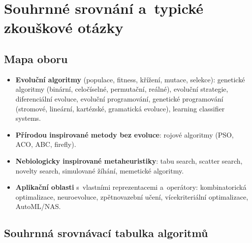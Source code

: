 \documentclass[11pt,a4paper]{article}
\theoremstyle{definition}
\begin{document}
\section*{Souhrnné srovnání a~typické zkouškové otázky}
\label{sec:zaver}
\subsection*{Mapa oboru}

\begin{itemize}
\item \textbf{Evoluční algoritmy} (populace, fitness, křížení, mutace, selekce):
  genetické algoritmy (binární, celočíselné, permutační, reálné), evoluční
  strategie, diferenciální evoluce, evoluční programování, genetické
  programování (stromové, lineární, kartézské, gramatická evoluce),
  learning classifier systems.
\item \textbf{Přírodou inspirované metody bez evoluce}: rojové algoritmy
  (PSO, ACO, ABC, firefly).
\item \textbf{Nebiologicky inspirované metaheuristiky}: tabu search,
  scatter search, novelty search, simulované žíhání, memetické algoritmy.
\item \textbf{Aplikační oblasti} s~vlastními reprezentacemi a~operátory:
  kombinatorická optimalizace, neuroevoluce, zpětnovazební učení,
  vícekriteriální optimalizace, AutoML/NAS.
\end{itemize}

\subsection*{Souhrnná srovnávací tabulka algoritmů}
\end{document}
